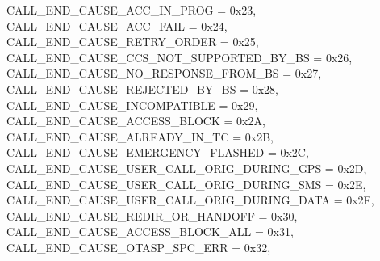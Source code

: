 \begin{DoxyItemize}
 C\+A\+L\+L\+\_\+\+E\+N\+D\+\_\+\+C\+A\+U\+S\+E\+\_\+\+A\+C\+C\+\_\+\+I\+N\+\_\+\+P\+R\+OG = 0x23,~\newline
 C\+A\+L\+L\+\_\+\+E\+N\+D\+\_\+\+C\+A\+U\+S\+E\+\_\+\+A\+C\+C\+\_\+\+F\+A\+IL = 0x24,~\newline
 C\+A\+L\+L\+\_\+\+E\+N\+D\+\_\+\+C\+A\+U\+S\+E\+\_\+\+R\+E\+T\+R\+Y\+\_\+\+O\+R\+D\+ER = 0x25,~\newline
 C\+A\+L\+L\+\_\+\+E\+N\+D\+\_\+\+C\+A\+U\+S\+E\+\_\+\+C\+C\+S\+\_\+\+N\+O\+T\+\_\+\+S\+U\+P\+P\+O\+R\+T\+E\+D\+\_\+\+B\+Y\+\_\+\+BS = 0x26,~\newline
 C\+A\+L\+L\+\_\+\+E\+N\+D\+\_\+\+C\+A\+U\+S\+E\+\_\+\+N\+O\+\_\+\+R\+E\+S\+P\+O\+N\+S\+E\+\_\+\+F\+R\+O\+M\+\_\+\+BS = 0x27,~\newline
 C\+A\+L\+L\+\_\+\+E\+N\+D\+\_\+\+C\+A\+U\+S\+E\+\_\+\+R\+E\+J\+E\+C\+T\+E\+D\+\_\+\+B\+Y\+\_\+\+BS = 0x28,~\newline
 C\+A\+L\+L\+\_\+\+E\+N\+D\+\_\+\+C\+A\+U\+S\+E\+\_\+\+I\+N\+C\+O\+M\+P\+A\+T\+I\+B\+LE = 0x29,~\newline
 C\+A\+L\+L\+\_\+\+E\+N\+D\+\_\+\+C\+A\+U\+S\+E\+\_\+\+A\+C\+C\+E\+S\+S\+\_\+\+B\+L\+O\+CK = 0x2A,~\newline
 C\+A\+L\+L\+\_\+\+E\+N\+D\+\_\+\+C\+A\+U\+S\+E\+\_\+\+A\+L\+R\+E\+A\+D\+Y\+\_\+\+I\+N\+\_\+\+TC = 0x2B,~\newline
 C\+A\+L\+L\+\_\+\+E\+N\+D\+\_\+\+C\+A\+U\+S\+E\+\_\+\+E\+M\+E\+R\+G\+E\+N\+C\+Y\+\_\+\+F\+L\+A\+S\+H\+ED = 0x2C,~\newline
 C\+A\+L\+L\+\_\+\+E\+N\+D\+\_\+\+C\+A\+U\+S\+E\+\_\+\+U\+S\+E\+R\+\_\+\+C\+A\+L\+L\+\_\+\+O\+R\+I\+G\+\_\+\+D\+U\+R\+I\+N\+G\+\_\+\+G\+PS = 0x2D,~\newline
 C\+A\+L\+L\+\_\+\+E\+N\+D\+\_\+\+C\+A\+U\+S\+E\+\_\+\+U\+S\+E\+R\+\_\+\+C\+A\+L\+L\+\_\+\+O\+R\+I\+G\+\_\+\+D\+U\+R\+I\+N\+G\+\_\+\+S\+MS = 0x2E,~\newline
 C\+A\+L\+L\+\_\+\+E\+N\+D\+\_\+\+C\+A\+U\+S\+E\+\_\+\+U\+S\+E\+R\+\_\+\+C\+A\+L\+L\+\_\+\+O\+R\+I\+G\+\_\+\+D\+U\+R\+I\+N\+G\+\_\+\+D\+A\+TA = 0x2F,~\newline
 C\+A\+L\+L\+\_\+\+E\+N\+D\+\_\+\+C\+A\+U\+S\+E\+\_\+\+R\+E\+D\+I\+R\+\_\+\+O\+R\+\_\+\+H\+A\+N\+D\+O\+FF = 0x30,~\newline
 C\+A\+L\+L\+\_\+\+E\+N\+D\+\_\+\+C\+A\+U\+S\+E\+\_\+\+A\+C\+C\+E\+S\+S\+\_\+\+B\+L\+O\+C\+K\+\_\+\+A\+LL = 0x31,~\newline
 C\+A\+L\+L\+\_\+\+E\+N\+D\+\_\+\+C\+A\+U\+S\+E\+\_\+\+O\+T\+A\+S\+P\+\_\+\+S\+P\+C\+\_\+\+E\+RR = 0x32,~\newline

\end{DoxyItemize}
